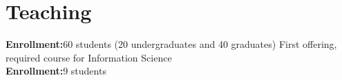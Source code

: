 \documentclass[10pt,letterpaper,final]{moderncv}
\begin{document}
\section{\textbf{Teaching}}
{\small {\textcolor{color5}{\textbf{Enrollment:}}}60 students (20 undergraduates and 40 graduates)}\vspace{6pt}
{\small First offering, required course for Information Science\\ {\textcolor{color5}{\textbf{Enrollment:}}}9 students\vspace{6pt}}
\end{document}
